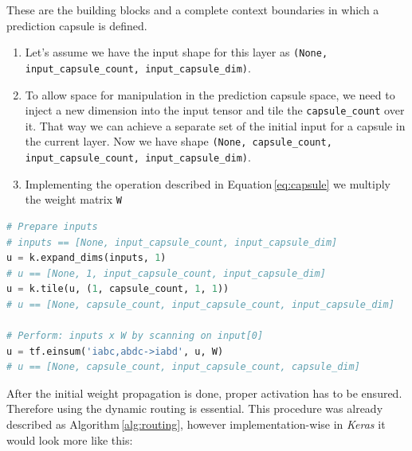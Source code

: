 These are the building blocks and a complete context boundaries in which a prediction capsule is defined.

\begin{enumerate}
    \item Let's assume we have the input shape for this layer as \texttt{(None, input\_capsule\_count, input\_capsule\_dim)}.
    \item To allow space for manipulation in the prediction capsule space, we need to inject a new dimension into the input tensor and tile the \texttt{capsule\_count} over it. That way we can achieve a separate set of the initial input for a capsule in the current layer. Now we have shape \texttt{(None, capsule\_count, input\_capsule\_count, input\_capsule\_dim)}.
    \item Implementing the operation described in Equation\,\ref{eq:capsule} we multiply the weight matrix \texttt{W}
\end{enumerate}

\begin{lstlisting}[language=Python, caption=Prediction capsule call without routing]
# Prepare inputs
# inputs == [None, input_capsule_count, input_capsule_dim]
u = k.expand_dims(inputs, 1)
# u == [None, 1, input_capsule_count, input_capsule_dim]
u = k.tile(u, (1, capsule_count, 1, 1))
# u == [None, capsule_count, input_capsule_count, input_capsule_dim]

# Perform: inputs x W by scanning on input[0]
u = tf.einsum('iabc,abdc->iabd', u, W)
# u == [None, capsule_count, input_capsule_count, capsule_dim]
\end{lstlisting}

After the initial weight propagation is done, proper activation has to be ensured. Therefore using the dynamic routing is essential. This procedure was already described as Algorithm\,\ref{alg:routing}, however implementation-wise in \textit{Keras} it would look more like this:

